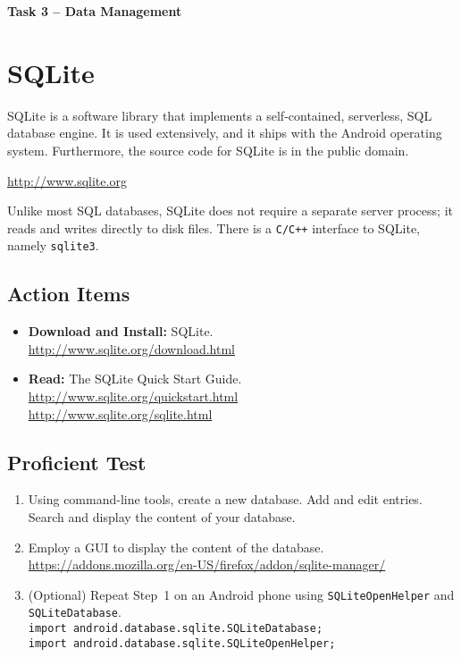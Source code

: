 \documentclass[11pt]{article}
\begin{document}
\begin{center}
{\bfseries \LARGE Task 3 -- Data Management\\[8mm]}
\end{center}


\section{SQLite}

SQLite is a software library that implements a self-contained, serverless, SQL database engine.
It is used extensively, and it ships with the Android operating system.
Furthermore, the source code for SQLite is in the public domain.
\begin{center}
\url{http://www.sqlite.org}
\end{center}
Unlike most SQL databases, SQLite does not require a separate server process; it reads and writes directly to disk files.
There is a \texttt{C/C++} interface to SQLite, namely \texttt{sqlite3}.


\subsection*{Action Items}

\begin{itemize}
\item \textbf{Download and Install:} SQLite. \\
\url{http://www.sqlite.org/download.html}
\item \textbf{Read:} The SQLite Quick Start Guide.\\
\url{http://www.sqlite.org/quickstart.html}\\
\url{http://www.sqlite.org/sqlite.html}
\end{itemize}


\subsection*{Proficient Test}

\begin{enumerate}
\item Using command-line tools, create a new database.
Add and edit entries.
Search and display the content of your database.
\item Employ a GUI to display the content of the database.\\
\url{https://addons.mozilla.org/en-US/firefox/addon/sqlite-manager/}
\item (Optional) Repeat Step~1 on an Android phone using \texttt{SQLiteOpenHelper} and \texttt{SQLiteDatabase}.\\
\texttt{import android.database.sqlite.SQLiteDatabase;}\\
\texttt{import android.database.sqlite.SQLiteOpenHelper;}
\end{enumerate}
\end{document}
